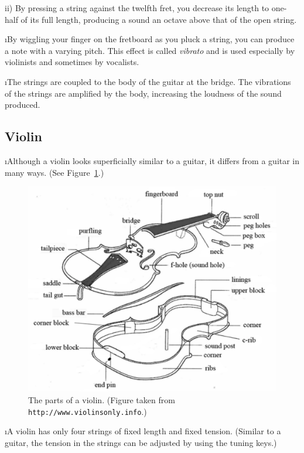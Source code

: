ii) By pressing a string against the twelfth fret,
you decrease its length to one-half of its full
length, producing a sound an octave above that of
the open string.

\i By wiggling your finger on the fretboard 
as you pluck a string, you can produce a note with a 
varying pitch.
This effect is called {\em vibrato} and is used 
especially by violinists and sometimes by vocalists.

\i The strings are coupled to the body of the 
guitar at the bridge.
The vibrations of the strings are amplified by
the body, increasing the loudness of the sound 
produced.

\ei
\subsection{Violin}
\bi

\i Although a violin looks superficially similar to a guitar, 
it differs from a guitar in many ways.
(See Figure~\ref{f:violin}.)
%
\begin{figure}[htbp]
\begin{center}
\includegraphics[width=.9\textwidth]{violin.pdf}
\caption{The parts of a violin.
(Figure taken from {\tt http://www.violinsonly.info}.)}
\label{f:violin}
\end{center}
\end{figure}

\i A violin has only four strings of fixed length
and fixed tension.
(Similar to a guitar, 
the tension in the strings can be adjusted
by using the tuning keys.)

